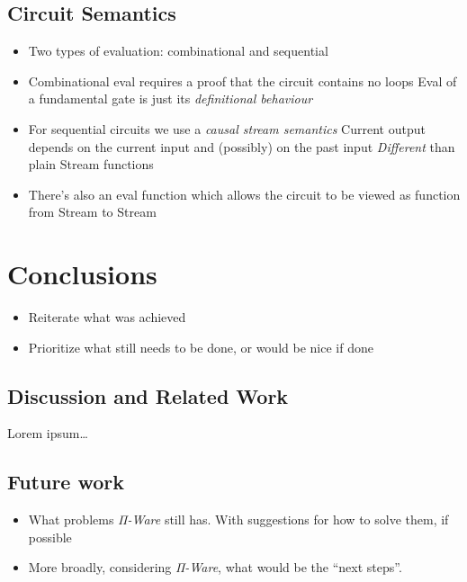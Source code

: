 \documentclass[a4paper,draft]{report}
\begin{document}
        \section{Circuit Semantics}
        \label{sec:eval-seq}
            \begin{itemize}
                \item Two types of evaluation: combinational and sequential
                \item Combinational eval requires a proof that the circuit contains no loops
                    \subitem Eval of a fundamental gate is just its \emph{definitional behaviour}

                \item For sequential circuits we use a \emph{causal stream semantics}
                    \subitem Current output depends on the current input and (possibly) on the past input
                    \subitem \emph{Different} than plain Stream functions

                \item There's also an eval function which allows the circuit to be viewed as function from Stream to Stream
            \end{itemize}


    \chapter{Conclusions}
    \label{chap:conclusions}
        \begin{itemize}
            \item Reiterate what was achieved
            \item Prioritize what still needs to be done, or would be nice if done
        \end{itemize}

        \section{Discussion and Related Work}
        \label{sec:related-work}
            Lorem ipsum\ldots

        \section{Future work}
        \label{sec:future-work}
            \begin{itemize}
                \item What problems \emph{Π-Ware} still has.
                    \subitem With suggestions for how to solve them, if possible

                \item More broadly, considering \emph{Π-Ware}, what would be the ``next steps''.
            \end{itemize}


    \newpage
    
    
\end{document}
